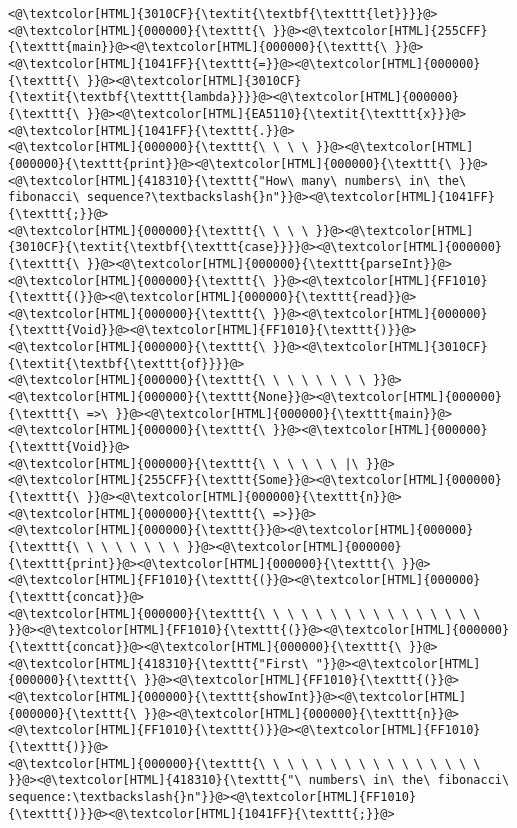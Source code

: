 \begin{lstlisting}
<@\textcolor[HTML]{3010CF}{\textit{\textbf{\texttt{let}}}}@><@\textcolor[HTML]{000000}{\texttt{\ }}@><@\textcolor[HTML]{255CFF}{\texttt{main}}@><@\textcolor[HTML]{000000}{\texttt{\ }}@><@\textcolor[HTML]{1041FF}{\texttt{=}}@><@\textcolor[HTML]{000000}{\texttt{\ }}@><@\textcolor[HTML]{3010CF}{\textit{\textbf{\texttt{lambda}}}}@><@\textcolor[HTML]{000000}{\texttt{\ }}@><@\textcolor[HTML]{EA5110}{\textit{\texttt{x}}}@><@\textcolor[HTML]{1041FF}{\texttt{.}}@>
<@\textcolor[HTML]{000000}{\texttt{\ \ \ \ }}@><@\textcolor[HTML]{000000}{\texttt{print}}@><@\textcolor[HTML]{000000}{\texttt{\ }}@><@\textcolor[HTML]{418310}{\texttt{"How\ many\ numbers\ in\ the\ fibonacci\ sequence?\textbackslash{}n"}}@><@\textcolor[HTML]{1041FF}{\texttt{;}}@>
<@\textcolor[HTML]{000000}{\texttt{\ \ \ \ }}@><@\textcolor[HTML]{3010CF}{\textit{\textbf{\texttt{case}}}}@><@\textcolor[HTML]{000000}{\texttt{\ }}@><@\textcolor[HTML]{000000}{\texttt{parseInt}}@><@\textcolor[HTML]{000000}{\texttt{\ }}@><@\textcolor[HTML]{FF1010}{\texttt{(}}@><@\textcolor[HTML]{000000}{\texttt{read}}@><@\textcolor[HTML]{000000}{\texttt{\ }}@><@\textcolor[HTML]{000000}{\texttt{Void}}@><@\textcolor[HTML]{FF1010}{\texttt{)}}@><@\textcolor[HTML]{000000}{\texttt{\ }}@><@\textcolor[HTML]{3010CF}{\textit{\textbf{\texttt{of}}}}@>
<@\textcolor[HTML]{000000}{\texttt{\ \ \ \ \ \ \ \ }}@><@\textcolor[HTML]{000000}{\texttt{None}}@><@\textcolor[HTML]{000000}{\texttt{\ =>\ }}@><@\textcolor[HTML]{000000}{\texttt{main}}@><@\textcolor[HTML]{000000}{\texttt{\ }}@><@\textcolor[HTML]{000000}{\texttt{Void}}@>
<@\textcolor[HTML]{000000}{\texttt{\ \ \ \ \ \ |\ }}@><@\textcolor[HTML]{255CFF}{\texttt{Some}}@><@\textcolor[HTML]{000000}{\texttt{\ }}@><@\textcolor[HTML]{000000}{\texttt{n}}@><@\textcolor[HTML]{000000}{\texttt{\ =>}}@>
<@\textcolor[HTML]{000000}{\texttt{}}@><@\textcolor[HTML]{000000}{\texttt{\ \ \ \ \ \ \ \ }}@><@\textcolor[HTML]{000000}{\texttt{print}}@><@\textcolor[HTML]{000000}{\texttt{\ }}@><@\textcolor[HTML]{FF1010}{\texttt{(}}@><@\textcolor[HTML]{000000}{\texttt{concat}}@>
<@\textcolor[HTML]{000000}{\texttt{\ \ \ \ \ \ \ \ \ \ \ \ \ \ \ \ }}@><@\textcolor[HTML]{FF1010}{\texttt{(}}@><@\textcolor[HTML]{000000}{\texttt{concat}}@><@\textcolor[HTML]{000000}{\texttt{\ }}@><@\textcolor[HTML]{418310}{\texttt{"First\ "}}@><@\textcolor[HTML]{000000}{\texttt{\ }}@><@\textcolor[HTML]{FF1010}{\texttt{(}}@><@\textcolor[HTML]{000000}{\texttt{showInt}}@><@\textcolor[HTML]{000000}{\texttt{\ }}@><@\textcolor[HTML]{000000}{\texttt{n}}@><@\textcolor[HTML]{FF1010}{\texttt{)}}@><@\textcolor[HTML]{FF1010}{\texttt{)}}@>
<@\textcolor[HTML]{000000}{\texttt{\ \ \ \ \ \ \ \ \ \ \ \ \ \ \ \ }}@><@\textcolor[HTML]{418310}{\texttt{"\ numbers\ in\ the\ fibonacci\ sequence:\textbackslash{}n"}}@><@\textcolor[HTML]{FF1010}{\texttt{)}}@><@\textcolor[HTML]{1041FF}{\texttt{;}}@>

\end{lstlisting}
